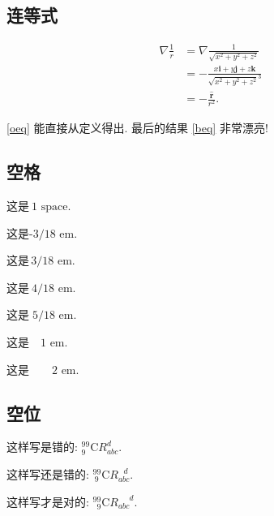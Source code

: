 \documentclass{ctexart}
\begin{document}
    \subsection{连等式}
    \begin{align}
        \nabla\frac{1}{r} & = \nabla\frac{1}{\sqrt{x^2+y^2+z^2}} \label{oeq}\\
            & = -\frac{x\boldsymbol{i}+y\boldsymbol{j}+z\boldsymbol{k}}
                      {\sqrt{x^2+y^2+z^2}^3} \nonumber \\
            & = -\frac{\hat{\boldsymbol{r}}}{r^2}. \tag{$\star$} \label{beq}
    \end{align}

    \eqref{oeq} 能直接从定义得出. 最后的结果 \eqref{beq} 非常漂亮!
    \subsection{空格}
    $ \text{这是} \  \text{1 space.} $

    $ \text{这是} \! \text{-3/18 em.} $

    $ \text{这是} \, \text{3/18 em.} $

    $ \text{这是} \: \text{4/18 em.} $

    $ \text{这是} \; \text{5/18 em.} $

    $ \text{这是} \quad \text{1 em.} $

    $ \text{这是} \qquad \text{2 em.} $
    \subsection{空位}
    这样写是错的: ${}^{99}_{ 9}\text{C}R_{abc}^{   d}$.

    这样写还是错的: ${}^{99}_{\ 9}\text{C}R_{abc}^{\ \ \ d}$.

    这样写才是对的: ${}^{99}_{\phantom{9}9}\text{C}R_{abc}^{\phantom{abc}d}$.
    \newpage
\end{document}
